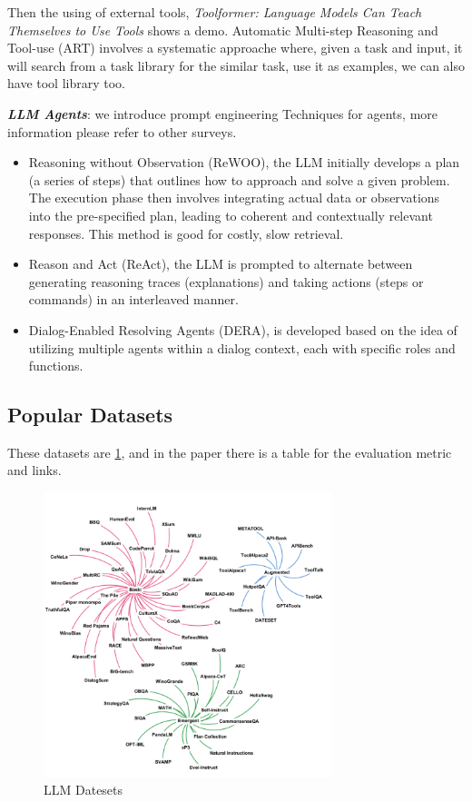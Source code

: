 \documentclass[10pt]{elegantbook}
\newcommand{\mydefination}[1]{\textbf{\textit{\textcolor{structurecolor}{#1}}}}
\begin{document}
\vspace{\baselineskip}

Then the using of external tools, \textit{Toolformer: Language Models Can Teach Themselves to Use Tools} shows a demo. Automatic Multi-step Reasoning and Tool-use
(ART) involves a systematic approache where, given a task and input, it will search from a task library for the similar task, use it as examples, we can also have
tool library too.

\vspace{\baselineskip}

\mydefination{LLM Agents}: we introduce prompt engineering Techniques for agents, more information please refer to other surveys.
\begin{itemize}
    \item Reasoning without Observation (ReWOO), the LLM initially develops a plan (a series of steps) that outlines
how to approach and solve a given problem. The execution phase then involves integrating actual data or observations into
the pre-specified plan, leading to coherent and contextually relevant responses. This method is good for costly, slow retrieval.
    \item Reason and Act (ReAct), the LLM is prompted to alternate between generating reasoning traces (explanations) and taking
actions (steps or commands) in an interleaved manner.
    \item Dialog-Enabled Resolving Agents (DERA), is developed based on the idea of utilizing multiple agents
within a dialog context, each with specific roles and functions.
\end{itemize}

\subsection{Popular Datasets}
These datasets are \ref{fig:datasets}, and in the paper there is a table for the evaluation metric and links.
\begin{figure}[htbp]
    \centering
    \includegraphics[width=0.75\textwidth]{image/datasets.png}
    \caption{LLM Datesets}
    \label{fig:datasets}
\end{figure}
\end{document}
